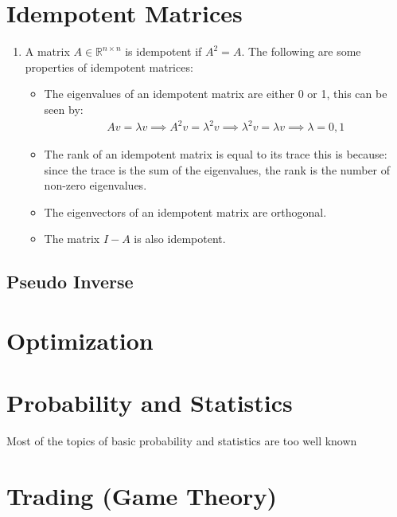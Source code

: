 \documentclass[letterpaper, 11pt]{article}
\newcommand{\R}{\mathbb{R}}	%
\newcommand{\1}{\mathds{1}}	%
\theoremstyle{definition}
\begin{document}
\section{Idempotent Matrices}
\begin{enumerate}
    \item A matrix $A \in \R^{n \times n}$ is idempotent if $A^2 = A$. The following are some properties of idempotent matrices:
    \begin{itemize}
        
        \item The eigenvalues of an idempotent matrix are either 0 or 1, this can be seen by:
        \begin{align}
            A v = \lambda v \implies A^2 v = \lambda^2 v \implies \lambda^2 v = \lambda v \implies \lambda = 0,1
        \end{align}
        \item The rank of an idempotent matrix is equal to its trace this is 
        because: since the trace is 
        the sum of the eigenvalues, the rank is the number of non-zero eigenvalues.
        \item The eigenvectors of an idempotent matrix are orthogonal. 
        \item The matrix $I - A$ is also idempotent.
    \end{itemize}
\end{enumerate}

\subsection{Pseudo Inverse}

\section{Optimization}


\section{Probability and Statistics}
Most of the topics of basic probability and statistics are too well known 




\section{Trading (Game Theory)}
\end{document}
